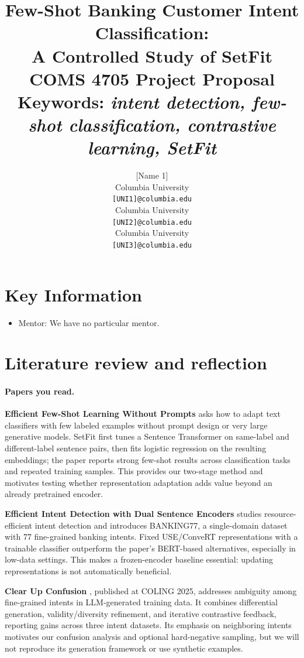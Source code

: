 \documentclass{article}
\title{Few-Shot Banking Customer Intent Classification:\\A Controlled Study of SetFit\\[0.5em]
\small\normalfont COMS 4705 Project Proposal\\
\small\normalfont\textbf{Keywords:} \textit{intent detection, few-shot classification, contrastive learning, SetFit}}
\author{[Name 1]\\Columbia University\\\texttt{[UNI1]@columbia.edu}
\And [Name 2]\\Columbia University\\\texttt{[UNI2]@columbia.edu}
\And [Name 3]\\Columbia University\\\texttt{[UNI3]@columbia.edu}}
\begin{document}
\maketitle

\section{Key Information}
\begin{itemize}
\item Mentor: We have no particular mentor.
\end{itemize}

\section{Literature review and reflection}
\paragraph{Papers you read.}
\textbf{Efficient Few-Shot Learning Without Prompts} \cite{tunstall2022setfit} asks how to adapt text classifiers with few labeled examples without prompt design or very large generative models. SetFit first tunes a Sentence Transformer on same-label and different-label sentence pairs, then fits logistic regression on the resulting embeddings; the paper reports strong few-shot results across classification tasks and repeated training samples. This provides our two-stage method and motivates testing whether representation adaptation adds value beyond an already pretrained encoder.

\textbf{Efficient Intent Detection with Dual Sentence Encoders} \cite{casanueva2020intent} studies resource-efficient intent detection and introduces BANKING77, a single-domain dataset with 77 fine-grained banking intents. Fixed USE/ConveRT representations with a trainable classifier outperform the paper's BERT-based alternatives, especially in low-data settings. This makes a frozen-encoder baseline essential: updating representations is not automatically beneficial.

\textbf{Clear Up Confusion} \cite{zhang2025confusion}, published at COLING 2025, addresses ambiguity among fine-grained intents in LLM-generated training data. It combines differential generation, validity/diversity refinement, and iterative contrastive feedback, reporting gains across three intent datasets. Its emphasis on neighboring intents motivates our confusion analysis and optional hard-negative sampling, but we will not reproduce its generation framework or use synthetic examples.
\end{document}
